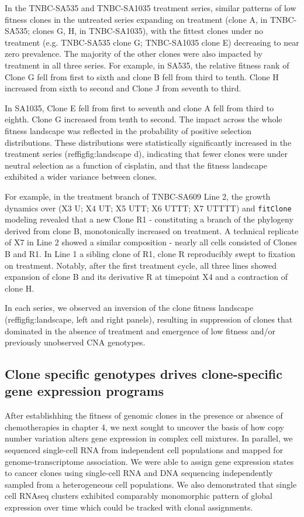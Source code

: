 In the TNBC-SA535 and TNBC-SA1035 treatment series, similar patterns of low fitness clones in the untreated series expanding on treatment (clone A, in TNBC-SA535; clones G, H, in TNBC-SA1035), with the fittest clones under no treatment (e.g. TNBC-SA535 clone G; TNBC-SA1035 clone E) decreasing to near zero prevalence. The majority of the other clones were also impacted by treatment in all three series. For example, in SA535, the relative fitness rank of Clone G fell from first to sixth and clone B fell from third to tenth.  Clone H increased from sixth to second and Clone J from seventh to third.  

In SA1035, Clone E fell from first to seventh and clone A fell from third to eighth. Clone G increased from tenth to second.  The impact across the whole fitness landscape was reflected in the probability of positive selection distributions.  These distributions were statistically significantly increased in the treatment series  (reffig{fig:landscape} d), indicating that fewer clones were under neutral selection as a function of cisplatin, and that the fitness landscape exhibited a wider variance between clones.

For example, in the treatment branch of TNBC-SA609 Line 2, the growth dynamics over (X3 U; X4 UT; X5 UTT; X6 UTTT; X7 UTTTT) and \texttt{fitClone} modeling revealed that a new Clone R1 - constituting a branch of the phylogeny derived from clone B,  monotonically increased on treatment.  A technical replicate of X7 in Line 2 showed a similar composition - nearly all cells consisted of Clones B and R1.  In Line 1 a sibling clone of R1, clone R reproducibly swept to fixation on treatment.  Notably, after the first treatment cycle, all three lines showed expansion of clone B and its derivative R at timepoint X4 and a contraction of clone H.

In each series, we observed an inversion of the clone fitness landscape (reffig{fig:landscape}, left and right panels), resulting in suppression of clones that dominated in the absence of treatment and emergence of low fitness and/or previously unobserved CNA genotypes.


\subsection{Clone specific genotypes drives clone-specific gene expression programs}

After establishhing the fitness of genomic clones in the presence or absence of chemotherapies in chapter 4, we next sought to uncover the basis of how copy number variation alters gene expression in complex cell mixtures. In parallel, we sequenced single-cell RNA from independent cell populations and mapped for genome-transcriptome association. 
We were able to assign gene expression states to cancer clones using single-cell RNA and DNA sequencing independently sampled from a heterogeneous cell populations. We also demonstrated that single cell RNAseq clusters exhibited comparably monomorphic pattern of global expression over time which could be tracked with clonal assignments.

